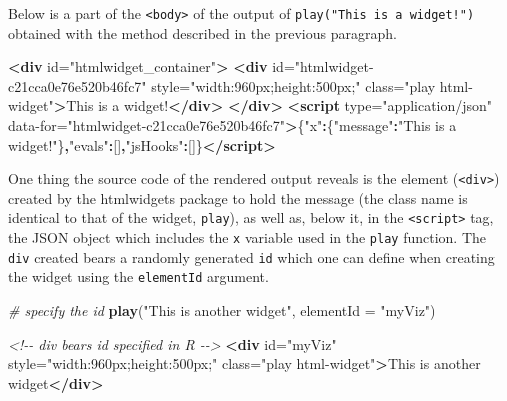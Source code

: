\documentclass[
]{krantz}
\makeatletter
\newenvironment{Shaded}{\begin{snugshade}}{\end{snugshade}}
\newcommand{\CommentTok}[1]{\textcolor[rgb]{0.37,0.37,0.37}{\textit{#1}}}
\newcommand{\DataTypeTok}[1]{\textcolor[rgb]{0.27,0.27,0.27}{#1}}
\newcommand{\KeywordTok}[1]{\textcolor[rgb]{0.27,0.27,0.27}{\textbf{#1}}}
\newcommand{\NormalTok}[1]{#1}
\newcommand{\OperatorTok}[1]{\textcolor[rgb]{0.43,0.43,0.43}{\textbf{#1}}}
\newcommand{\OtherTok}[1]{\textcolor[rgb]{0.37,0.37,0.37}{#1}}
\newcommand{\StringTok}[1]{\textcolor[rgb]{0.5,0.5,0.5}{#1}}
\newenvironment{kframe}{%
\medskip{}
\setlength{\fboxsep}{.8em}
 \def\at@end@of@kframe{}%
 \ifinner\ifhmode%
  \def\at@end@of@kframe{\end{minipage}}%
  \begin{minipage}{\columnwidth}%
 \fi\fi%
 \def\FrameCommand##1{\hskip\@totalleftmargin \hskip-\fboxsep
 \colorbox{shadecolor}{##1}\hskip-\fboxsep
     \hskip-\linewidth \hskip-\@totalleftmargin \hskip\columnwidth}%
 \MakeFramed {\advance\hsize-\width
   \@totalleftmargin\z@ \linewidth\hsize
   \@setminipage}}%
 {\par\unskip\endMakeFramed%
 \at@end@of@kframe}
\renewenvironment{Shaded}{\begin{kframe}}{\end{kframe}}
\makeatother
\begin{document}
Below is a part of the \texttt{\textless{}body\textgreater{}} of the output of \texttt{play("This\ is\ a\ widget!")} obtained with the method described in the previous paragraph.

\begin{Shaded}
\begin{Highlighting}[]
\KeywordTok{\textless{}div}\OtherTok{ id=}\StringTok{"htmlwidget\_container"}\KeywordTok{\textgreater{}}
  \KeywordTok{\textless{}div}\OtherTok{ id=}\StringTok{"htmlwidget{-}c21cca0e76e520b46fc7"}\OtherTok{ style=}\StringTok{"width:960px;height:500px;"}\OtherTok{ class=}\StringTok{"play html{-}widget"}\KeywordTok{\textgreater{}}\NormalTok{This is a widget!}\KeywordTok{\textless{}/div\textgreater{}}
\KeywordTok{\textless{}/div\textgreater{}}
\KeywordTok{\textless{}script}\OtherTok{ type=}\StringTok{"application/json"}\OtherTok{ data{-}for=}\StringTok{"htmlwidget{-}c21cca0e76e520b46fc7"}\KeywordTok{\textgreater{}}\NormalTok{\{}\StringTok{"x"}\OperatorTok{:}\NormalTok{\{}\StringTok{"message"}\OperatorTok{:}\StringTok{"This is a widget!"}\NormalTok{\}}\OperatorTok{,}\StringTok{"evals"}\OperatorTok{:}\NormalTok{[]}\OperatorTok{,}\StringTok{"jsHooks"}\OperatorTok{:}\NormalTok{[]\}}\KeywordTok{\textless{}/script\textgreater{}}
\end{Highlighting}
\end{Shaded}

One thing the source code of the rendered output reveals is the element (\texttt{\textless{}div\textgreater{}}) created by the htmlwidgets package to hold the message (the class name is identical to that of the widget, \texttt{play}), as well as, below it, in the \texttt{\textless{}script\textgreater{}} tag, the JSON object which includes the \texttt{x} variable used in the \texttt{play} function. The \texttt{div} created bears a randomly generated \texttt{id} which one can define when creating the widget using the \texttt{elementId} argument.

\begin{Shaded}
\begin{Highlighting}[]
\CommentTok{\# specify the id}
\KeywordTok{play}\NormalTok{(}\StringTok{"This is another widget"}\NormalTok{, }\DataTypeTok{elementId =} \StringTok{"myViz"}\NormalTok{)}
\end{Highlighting}
\end{Shaded}

\begin{Shaded}
\begin{Highlighting}[]
\CommentTok{\textless{}!{-}{-} div bears id specified in R {-}{-}\textgreater{}}
\KeywordTok{\textless{}div}\OtherTok{ id=}\StringTok{"myViz"}\OtherTok{ style=}\StringTok{"width:960px;height:500px;"}\OtherTok{ class=}\StringTok{"play html{-}widget"}\KeywordTok{\textgreater{}}\NormalTok{This is another widget}\KeywordTok{\textless{}/div\textgreater{}}
\end{Highlighting}
\end{Shaded}
\end{document}
